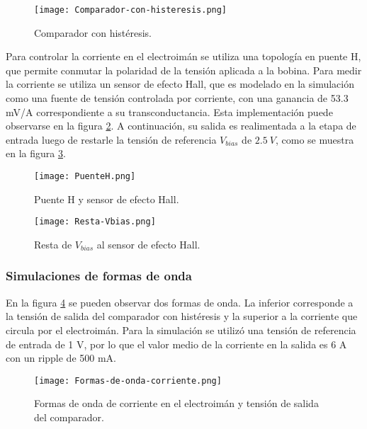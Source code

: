 \begin{figure}[H]
	\centering
	\texttt{[image: Comparador-con-histeresis.png]}
	\caption{Comparador con histéresis.}
	\label{fig:img_comp-con-hist}
\end{figure}

\noindent Para controlar la corriente en el electroimán se utiliza una topología en puente H, que permite conmutar la polaridad de la tensión aplicada a la bobina. Para medir la corriente se utiliza un sensor de efecto Hall, que es modelado en la simulación como  una fuente de tensión controlada por corriente, con una ganancia de 53.3 mV/A correspondiente a su transconductancia. Esta implementación puede observarse en la figura \ref{fig:img_puenteH}. A continuación, su salida es realimentada a la etapa de entrada luego de restarle la tensión de referencia  $V_{bias}$ de $2.5\:V$, como se muestra en la figura \ref{fig:img_resta-Vbias}. 

\begin{figure}[H]
	\centering
	\texttt{[image: PuenteH.png]}
	\caption{Puente H y sensor de efecto Hall.}
	\label{fig:img_puenteH}
\end{figure}

\begin{figure}[H]
	\centering
	\texttt{[image: Resta-Vbias.png]}
	\caption{Resta de $V_{bias}$ al sensor de efecto Hall.}
	\label{fig:img_resta-Vbias}
\end{figure}

\subsubsection{Simulaciones de formas de onda}

\noindent En la figura \ref{fig:img_formas-de-onda-corriente} se pueden observar dos formas de onda. La inferior  corresponde a la tensión de salida del comparador con histéresis y la superior a la corriente que circula por el electroimán. Para la simulación se utilizó una tensión de referencia de entrada de 1 V, por lo que el valor medio de la corriente en la salida es 6 A con un ripple de 500 mA.

\begin{figure}[H]
	\centering
	\texttt{[image: Formas-de-onda-corriente.png]}
	\caption{Formas de onda de corriente en el electroimán y tensión de salida del comparador.}
	\label{fig:img_formas-de-onda-corriente}
\end{figure}



